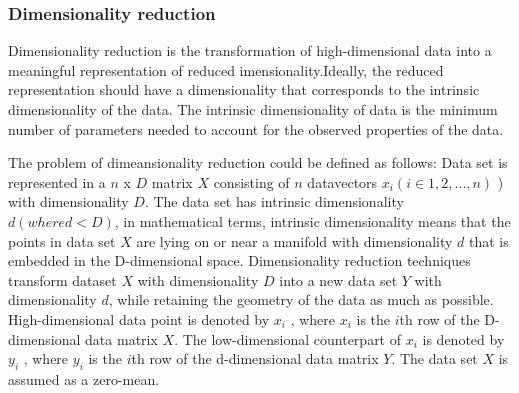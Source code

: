 \subsubsection{Dimensionality reduction}

Dimensionality reduction \cite{BIB13} is the transformation of high-dimensional data into a meaningful representation of reduced imensionality.Ideally, the reduced representation should have a dimensionality that corresponds to the intrinsic dimensionality of the data. The intrinsic dimensionality of data is the minimum number of parameters needed to account for the observed properties of the data.


The problem of dimeansionality reduction could be defined as follows: Data set is represented in a $n$ x $D$ matrix $X$ consisting of $n$ datavectors $x_{i} (i \in {1, 2, ..., n})$ ) with dimensionality $D$. The data set has intrinsic dimensionality $d (where d < D)$, in mathematical terms, intrinsic dimensionality means that the points in data set $X$ are
lying on or near a manifold with dimensionality $d$ that is embedded in the D-dimensional space. 
Dimensionality reduction techniques transform dataset $X$ with dimensionality $D$ into a new data set $Y$ with dimensionality $d$, while retaining the geometry of the data as much as possible. High-dimensional data point is denoted by $x_{i}$ , where $x_{i}$ is the $i$th row of the D-dimensional data matrix $X$. The low-dimensional counterpart of $x_{i}$ is denoted by $y_{i}$ , where $y_{i}$ is the $i$th row of the d-dimensional data matrix $Y$. The data set $X$ is assumed as a zero-mean.



